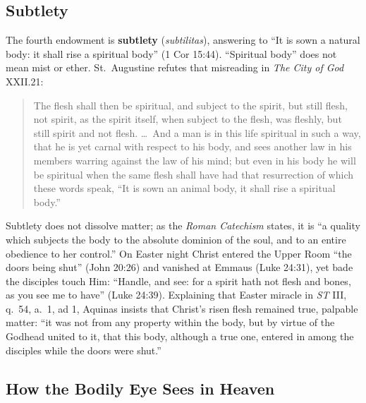\subsection*{Subtlety}

The fourth endowment is \textbf{subtlety} (\textit{subtilitas}), answering to ``It is sown a natural body: it shall rise a spiritual body'' (1 Cor 15:44). ``Spiritual body'' does not mean mist or ether. St.\ Augustine refutes that misreading in \textit{The City of God} XXII.21:

\begin{quote}
The flesh shall then be spiritual, and subject to the spirit, but still flesh, not spirit, as the spirit itself, when subject to the flesh, was fleshly, but still spirit and not flesh. \dots\ And a man is in this life spiritual in such a way, that he is yet carnal with respect to his body, and sees another law in his members warring against the law of his mind; but even in his body he will be spiritual when the same flesh shall have had that resurrection of which these words speak, ``It is sown an animal body, it shall rise a spiritual body.''
\end{quote}

Subtlety does not dissolve matter; as the \textit{Roman Catechism} states, it is ``a quality which subjects the body to the absolute dominion of the soul, and to an entire obedience to her control.'' On Easter night Christ entered the Upper Room ``the doors being shut'' (John 20:26) and vanished at Emmaus (Luke 24:31), yet bade the disciples touch Him: ``Handle, and see: for a spirit hath not flesh and bones, as you see me to have'' (Luke 24:39). Explaining that Easter miracle in \textit{ST} III, q.\ 54, a.\ 1, ad 1, Aquinas insists that Christ's risen flesh remained true, palpable matter: ``it was not from any property within the body, but by virtue of the Godhead united to it, that this body, although a true one, entered in among the disciples while the doors were shut.''

\subsection*{How the Bodily Eye Sees in Heaven}

